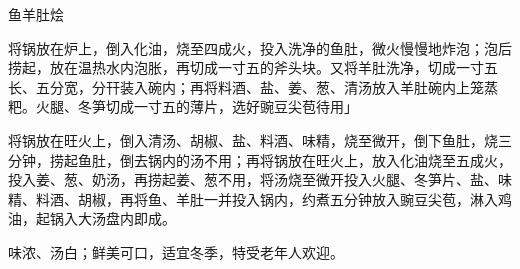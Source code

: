 \begin{recipe}{鱼羊肚烩}

\ingredients



\cooking

\step 将锅放在炉上，倒入化油，烧至四成火，投入洗净的鱼肚，微火慢慢地炸泡；泡后捞起，放在温热水内泡胀，再切成一寸五的斧头块。又将羊肚洗净，切成一寸五长、五分宽，分幵装入碗内；再将料酒、盐、姜、葱、清汤放入羊肚碗内上笼蒸粑。火腿、冬笋切成一寸五的薄片，选好豌豆尖苞待用」

\step 将锅放在旺火上，倒入清汤、胡椒、盐、料酒、味精，烧至微开，倒下鱼肚，烧三分钟，捞起鱼肚，倒去锅内的汤不用；再将锅放在旺火上，放入化油烧至五成火，投入姜、葱、奶汤，再捞起姜、葱不用，将汤烧至微开投入火腿、冬笋片、盐、味精、料酒、胡椒，再将鱼、羊肚一并投入锅内，约煮五分钟放入豌豆尖苞，淋入鸡油，起锅入大汤盘内即成。

\notes

味浓、汤白；鲜美可口，适宜冬季，特受老年人欢迎。

\end{recipe}

